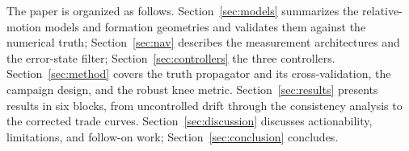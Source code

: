 The paper is organized as follows. Section~\ref{sec:models} summarizes the
relative-motion models and formation geometries and validates them against
the numerical truth; Section~\ref{sec:nav} describes the measurement
architectures and the error-state filter; Section~\ref{sec:controllers}
the three controllers. Section~\ref{sec:method} covers the truth
propagator and its cross-validation, the campaign design, and the robust
knee metric. Section~\ref{sec:results} presents results in six blocks,
from uncontrolled drift through the consistency analysis to the corrected
trade curves. Section~\ref{sec:discussion} discusses actionability,
limitations, and follow-on work; Section~\ref{sec:conclusion} concludes.
